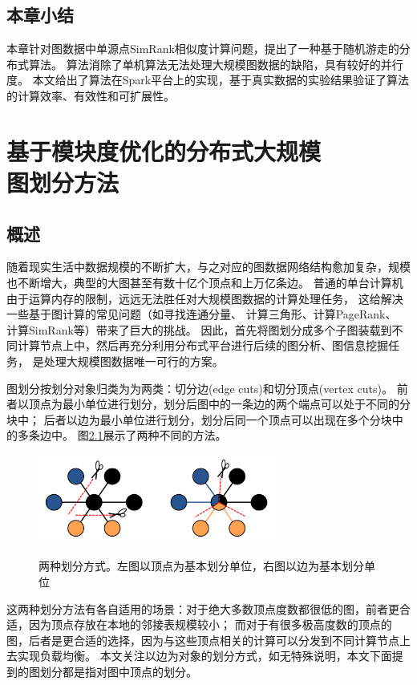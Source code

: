 \documentclass[master]{njuthesis}
\begin{document}
\section{本章小结}
本章针对图数据中单源点SimRank相似度计算问题，提出了一种基于随机游走的分布式算法。
算法消除了单机算法无法处理大规模图数据的缺陷，具有较好的并行度。
本文给出了算法在Spark平台上的实现，基于真实数据的实验结果验证了算法的计算效率、有效性和可扩展性。
\chapter{基于模块度优化的分布式大规模  \\ 图划分方法}\label{chapter_graphpartition}
\section{概述}
随着现实生活中数据规模的不断扩大，与之对应的图数据网络结构愈加复杂，规模也不断增大，典型的大图甚至有数十亿个顶点和上万亿条边。
普通的单台计算机由于运算内存的限制，远远无法胜任对大规模图数据的计算处理任务，
这给解决一些基于图计算的常见问题（如寻找连通分量\cite{DBLP:conf/sc/HongRO13}、
计算三角形\cite{DBLP:journals/corr/abs-1011-0468}、计算PageRank\cite{page1999pagerank}、
计算SimRank\cite{jeh2002simrank}等）带来了巨大的挑战。
因此，首先将图划分成多个子图装载到不同计算节点上中，然后再充分利用分布式平台进行后续的图分析、图信息挖掘任务，
是处理大规模图数据唯一可行的方案。

图划分按划分对象归类为为两类：切分边(edge cuts)和切分顶点(vertex cuts)。
前者以顶点为最小单位进行划分，划分后图中的一条边的两个端点可以处于不同的分块中；
后者以边为最小单位进行划分，划分后同一个顶点可以出现在多个分块中的多条边中。
图\ref{fig:partition_scheme}展示了两种不同的方法。
\begin{figure}[h]
  \centering
  \includegraphics[width= 0.7\textwidth]{figure/partition_approach.png}\\
  \caption{两种划分方式。左图以顶点为基本划分单位，右图以边为基本划分单位}
  \label{fig:partition_scheme}
\end{figure}
这两种划分方法有各自适用的场景\cite{DBLP:conf/eurosys/ChenSCC15}：对于绝大多数顶点度数都很低的图，前者更合适，因为顶点存放在本地的邻接表规模较小；
而对于有很多极高度数的顶点的图，后者是更合适的选择，因为与这些顶点相关的计算可以分发到不同计算节点上去实现负载均衡。
本文关注以边为对象的划分方式，如无特殊说明，本文下面提到的图划分都是指对图中顶点的划分。
\end{document}
